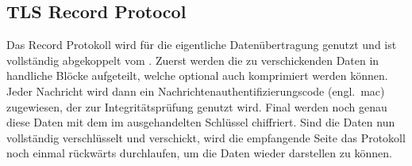\subsection{TLS Record Protocol}\label{subsec:tls-record-protocol}
	Das Record Protokoll wird für die eigentliche Datenübertragung genutzt
	und ist vollständig abgekoppelt vom .
	Zuerst werden die zu verschickenden Daten in handliche Blöcke aufgeteilt,
	welche optional auch komprimiert werden können.
	Jeder Nachricht wird dann ein Nachrichtenauthentifizierungscode (engl.\ \gls{mac}) zugewiesen,
	der zur Integritätsprüfung genutzt wird.
	Final werden noch genau diese Daten
	mit dem im  ausgehandelten Schlüssel
	chiffriert.
	Sind die Daten nun vollständig verschlüsselt und verschickt,
	wird die empfangende Seite das Protokoll noch einmal rückwärts durchlaufen,
	um die Daten wieder darstellen zu können.